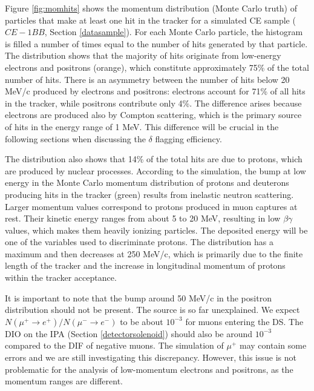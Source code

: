 Figure \ref{fig:momhits} shows the 
momentum distribution (Monte Carlo truth) of 
particles that make at least one hit in the 
tracker for a simulated CE sample ($CE-1BB$, 
Section \ref{datasample}). 
For each Monte Carlo particle, the 
histogram is filled a number of times 
equal to the number of hits generated 
by that particle.
The distribution shows that the 
majority of hits originate from 
low-energy electrons and positrons 
(orange), which constitute approximately 
75\% of the total number of hits. 
There is an asymmetry between the 
number of hits below 20 MeV/c 
produced by electrons and positrons: 
electrons account for 71\% of all hits in 
the tracker, while positrons contribute only 4\%. The difference  
arises because electrons are produced also by Compton scattering, which is 
the primary source of hits in the energy 
range of 1 MeV. This difference 
will be crucial in 
the following sections when discussing 
the $\delta$ flagging efficiency.

The distribution also shows that 14\% of 
the total hits are due to protons, 
which are produced by nuclear processes. 
According to the simulation, the bump at low energy in the Monte Carlo momentum 
distribution of protons and deuterons producing 
hits in the tracker (green) results from inelastic neutron scattering.
Larger momentum values correspond to protons produced in muon 
captures at rest. Their kinetic energy ranges from about 
5 to 20 MeV, resulting in low $\beta \gamma$ values, 
which makes them heavily ionizing particles. 
The deposited energy will be one of the variables used to discriminate protons. 
The distribution has a maximum 
and then decreases at 250 MeV/c, which is 
primarily due to the finite length of the tracker and the increase in 
longitudinal momentum of protons within the tracker acceptance.

It is important to note that the bump 
around 50 MeV/c in the positron distribution should not be 
present. The source is so far unexplained. 
We expect $N(\mu^+ \rightarrow e^+ )/N(\mu^- \rightarrow e^- )$ 
to be about $10^{-3}$ for muons entering the DS. The DIO on the IPA 
(Section \ref{detectorsolenoid}) should also be around $10^{-3}$ compared to the DIF of 
negative muons. The simulation of $\mu^+$ may 
contain some errors and we are still 
investigating this discrepancy. However, this issue is not problematic for the analysis 
of low-momentum electrons and positrons, 
as the momentum ranges are different.

